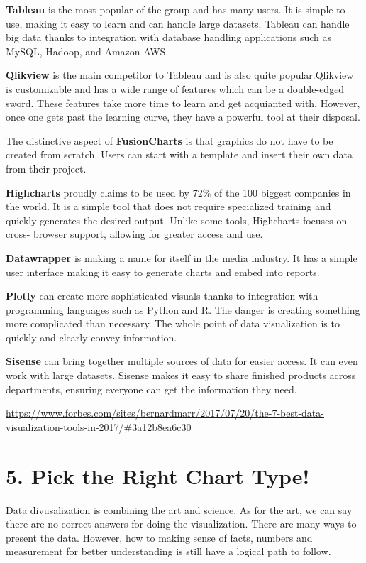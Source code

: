 \documentclass[]{book}
\theoremstyle{definition}
\theoremstyle{definition}
\theoremstyle{definition}
\theoremstyle{remark}
\begin{document}
\textbf{Tableau} is the most popular of the group and has many users. It
is simple to use, making it easy to learn and can handle large datasets.
Tableau can handle big data thanks to integration with database handling
applications such as MySQL, Hadoop, and Amazon AWS.

\textbf{Qlikview} is the main competitor to Tableau and is also quite
popular.Qlikview is customizable and has a wide range of features which
can be a double-edged sword. These features take more time to learn and
get acquianted with. However, once one gets past the learning curve,
they have a powerful tool at their disposal.

The distinctive aspect of \textbf{FusionCharts} is that graphics do not
have to be created from scratch. Users can start with a template and
insert their own data from their project.

\textbf{Highcharts} proudly claims to be used by 72\% of the 100 biggest
companies in the world. It is a simple tool that does not require
specialized training and quickly generates the desired output. Unlike
some tools, Highcharts focuses on cross- browser support, allowing for
greater access and use.

\textbf{Datawrapper} is making a name for itself in the media industry.
It has a simple user interface making it easy to generate charts and
embed into reports.

\textbf{Plotly} can create more sophisticated visuals thanks to
integration with programming languages such as Python and R. The danger
is creating something more complicated than necessary. The whole point
of data visualization is to quickly and clearly convey information.

\textbf{Sisense} can bring together multiple sources of data for easier
access. It can even work with large datasets. Sisense makes it easy to
share finished products across departments, ensuring everyone can get
the information they need.

\url{https://www.forbes.com/sites/bernardmarr/2017/07/20/the-7-best-data-visualization-tools-in-2017/\#3a12b8ea6c30}

\section{5. Pick the Right Chart Type!}\label{pick-the-right-chart-type}

Data divusalization is combining the art and science. As for the art, we
can say there are no correct answers for doing the visualization. There
are many ways to present the data. However, how to making sense of
facts, numbers and measurement for better understanding is still have a
logical path to follow.
\end{document}
